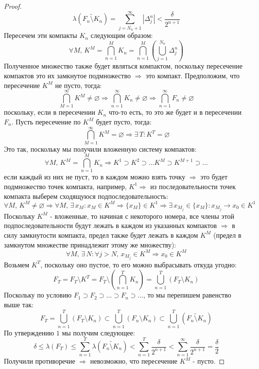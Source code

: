 \documentclass[12pt]{article}
\newcommand{\VN}{\varnothing}
\theoremstyle{definition}
\newcommand{\wte}[1]{\widetilde{#1}}
\begin{document}
\begin{proof}
	$$
		\lambda\left(\wte{F_n \setminus K_n}\right) = \sum\limits_{j = N_n + 1}^{\infty}|\Delta_j^n| < \dfrac{\delta}{2^{n+1}}
	$$
	Пересечем эти компакты $K_n$ следующим образом:
	$$
		\forall M, \, K^M = \bigcap\limits_{n = 1}^M K_n = \bigcap\limits_{n = 1}^M \left(\bigcup\limits_{j = 1}^{N_n} \Delta_j^n \right) 
	$$
	Полученное множество также будет являться компактом, поскольку пересечение компактов это их замкнутое подмножество $\Rightarrow$ это компакт. Предположим, что пересечение $K^M$ не пусто, тогда:
	$$
		\bigcap\limits_{M = 1}^{\infty} K^M \neq \VN \Rightarrow \bigcap\limits_{n = 1}^{\infty} K_n \neq \VN
		\Rightarrow \bigcap\limits_{n = 1}^{\infty} F_n \neq \VN
	$$
	поскольку, если в пересечении $K_n$ что-то есть, то это же будет и в пересечении $F_n$. Пусть пересечение по $K^M$ будет пусто, тогда:
	$$
		\bigcap\limits_{M = 1}^{\infty} K^M = \VN \Rightarrow \exists \, T \colon K^{T} = \VN
	$$
	Это так, поскольку мы получили вложенную систему компактов:
	$$
		\forall M, \, K^M = \bigcap\limits_{n = 1}^M K_n \Rightarrow K^1 \supset K^2 \supset \dotsc K^M \supset K^{M+1} \supset \dotsc
	$$
	если каждый из них не пуст, то в каждом можно взять точку $\Rightarrow$ это будет подмножество точек компакта, например, $K^1 \Rightarrow$ из последовательности точек компакта выберем сходящуюся подпоследовательность: 
	$$
		\forall M, \, K^M \neq \VN \Rightarrow  \forall M, \, \exists \, x_M \colon x_M \in K^M \Rightarrow \{x_M\} \in K^1 \Rightarrow \exists\, x_{M_j} \in \{x_M\} \colon x_{M_j} \to x_0 \in K^1
	$$	
	Поскольку $K^M$ - вложенные, то начиная с некоторого номера, все члены этой подпоследовательности будут лежать в каждом из указанных компактов $\Rightarrow$ в силу замкнутости компакта, предел также будет лежать в каждом $K^M$ (предел в замкнутом множестве принадлежит этому же множеству):
	$$
		\forall M, \, \exists \, N \colon \forall j > N, \, x_{M_j} \in K^M \Rightarrow x_0 \in K^M
	$$
	Возьмем $K^{T}$, поскольку оно пустое, то его можно выбрасывать откуда угодно:
	$$
		F_T = F_T \setminus K^{T} = F_T \setminus \left(\bigcap\limits_{n = 1}^T K_n\right) = \bigcup\limits_{n = 1}^T \left(F_T \setminus K_n\right)
	$$
	Поскольку по условию $F_1 \supset F_2 \supset \dotsc \supset F_n \supset \dotsc$, то мы перепишем равенство выше так:
	$$
		F_T = \bigcup\limits_{n = 1}^T \left(F_T \setminus K_n\right) \subset \bigcup\limits_{n = 1}^T \left(F_n \setminus K_n\right) \subset \bigcup\limits_{n = 1}^T \left(\wte{F_n \setminus K_n}\right)
	$$
	По утверждению $1$ мы получим следующее:
	$$
		\delta \leq \lambda(F_T) \leq \sum\limits_{n = 1}^T \lambda\left(\wte{F_n \setminus K_n}\right) < \sum\limits_{n = 1}^T \dfrac{\delta}{2^{n+1}} < \sum\limits_{n = 1}^{\infty} \dfrac{\delta}{2^{n+1}} = \dfrac{\delta}{2}
	$$
	Получили противоречие $\Rightarrow$ невозможно, что пересечение $K^M$ - пусто.
\end{proof}
\end{document}
